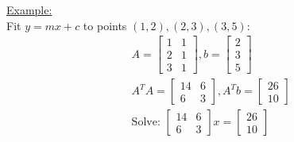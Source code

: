 \documentclass[8pt, a4paper, landscape]{extarticle} %
\begin{document}
\begin{multicols*}{4}
  \underline{Example:}\\
  Fit \( y = mx + c \) to points \( (1,2), (2,3), (3,5) \):
  \[
    \begin{aligned}
       & A = \begin{bmatrix} 1 & 1 \\ 2 & 1 \\ 3 & 1 \end{bmatrix}, b = \begin{bmatrix} 2 \\ 3 \\ 5 \end{bmatrix} \\
       & A^T A = \begin{bmatrix} 14 & 6 \\ 6 & 3 \end{bmatrix}, A^T b = \begin{bmatrix} 26 \\ 10 \end{bmatrix}    \\
       & \text{Solve: } \begin{bmatrix} 14 & 6 \\ 6 & 3 \end{bmatrix} x = \begin{bmatrix} 26 \\ 10 \end{bmatrix}
    \end{aligned}
  \]


\end{multicols*}
\end{document}
